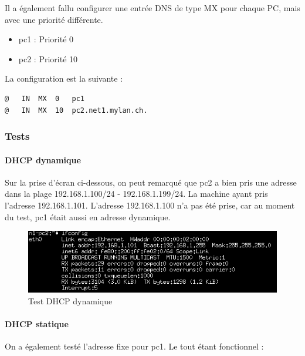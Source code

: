 \documentclass{article}
\begin{document}
Il a également fallu configurer une entrée DNS de type MX pour chaque PC, mais avec une priorité différente.

\begin{itemize}
	\item pc1 : Priorité 0
	\item pc2 : Priorité 10
\end{itemize}

La configuration est la suivante : 

\begin{lstlisting}
@	IN	MX	0	pc1
@	IN	MX	10	pc2.net1.mylan.ch.
\end{lstlisting}

\clearpage

\subsubsection{Tests}

\paragraph{DHCP dynamique}

Sur la prise d'écran ci-dessous, on peut remarqué que pc2 a bien pris une adresse dans la plage 192.168.1.100/24 - 192.168.1.199/24. La machine ayant pris l'adresse 192.168.1.101. L'adresse 192.168.1.100 n'a pas été prise, car au moment du test, pc1 était aussi en adresse dynamique.

\begin{figure}[!h]
	\centering
	\includegraphics{./captures/testpc2-dhcp.png}
	\caption{Test DHCP dynamique}
	\label{fig:Test DHCP dynamiqu}
\end{figure}

\paragraph{DHCP statique}

On a également testé l'adresse fixe pour pc1. Le tout étant fonctionnel :
\end{document}
